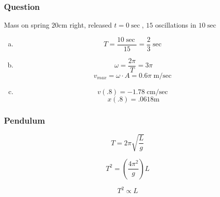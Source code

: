 \subsubsection{Question}

Mass on spring $20\si{\cm}$ right, released $t = 0\sec$, $15$ oscillations in $10\sec$

\begin{enumerate}[a.]
    \item $$T = \frac{10\sec}{15} = \frac{2}{3}\sec$$
    \item $$\omega = \frac{2\pi}{T} = 3\pi$$
    $$v_{max} = \omega \cdot A = 0.6\pi \si{\m\per\sec}$$
    \item $$v(.8) = -1.78 \si{\cm\per\sec}$$
    $$x(.8) = .0618\si{\m}$$
\end{enumerate}

\subsubsection{Pendulum}

$$T = 2\pi \sqrt{\frac{L}{g}}$$

$$T^2 = \left(\frac{4\pi^2}{g}\right)L$$

$$T^2 \propto L$$
